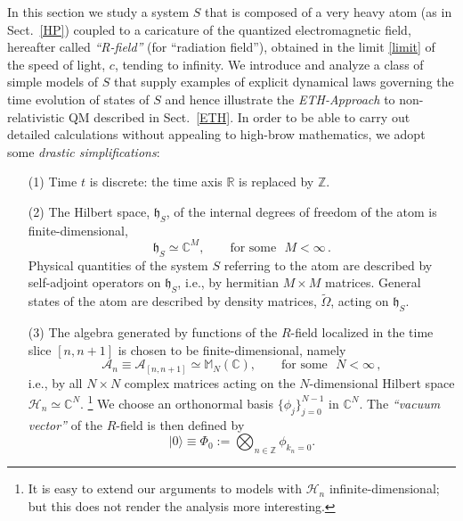 \documentclass[12pt]{article}
\begin{document}
In this section we study a system $S$ that is composed of a very heavy atom (as in Sect.~\ref{HP}) coupled to a
caricature of the quantized electromagnetic field, hereafter called \textit{``R-field''} (for ``radiation field''), obtained
in the limit \eqref{limit} of the speed of light, $c$, tending to infinity. We introduce and analyze a class of simple
models of $S$ that supply examples of explicit dynamical laws governing the time evolution of states of $S$ and
hence illustrate the \textit{\textit{ETH}-Approach} to non-relativistic QM described in Sect.~\ref{ETH}. In order to be able
to carry out detailed calculations without appealing to high-brow mathematics, we adopt some \textit{drastic simplifications}:
\begin{enumerate}
\item[(1)]{Time $t$ is discrete: the time axis $\mathbb{R}$ is replaced by $\mathbb{Z}$.}
\item[(2)]{ The Hilbert space, $\mathfrak{h}_S$, of the internal degrees of freedom of the atom is finite-dimensional,
\begin{equation}\label{atom}
\mathfrak{h}_S \simeq \mathbb{C}^{M}, \qquad \text{for some }\,\, M<\infty\,.
\end{equation}
Physical quantities of the system $S$ referring to the atom are described by self-adjoint operators on $\mathfrak{h}_S$,
i.e., by hermitian $M\times M$ matrices. General states of the atom are described by density matrices, $\widetilde{\Omega}$,
acting on $\mathfrak{h}_S$.}
\item[(3)]{The algebra generated by functions of the $R$-field localized in the time slice $[n,n+1]$ is chosen to be finite-dimensional, namely
\begin{equation}\label{algebra at fixed time}
\mathcal{A}_{n}\equiv \mathcal{A}_{[n,n+1]} \simeq \mathbb{M}_{N}(\mathbb{C}), \qquad \text{for some  }\,\, N<\infty\,,
\end{equation}
i.e., by all $N\times N$ complex matrices acting on the $N$-dimensional Hilbert space \mbox{$\mathcal{H}_n \simeq
\mathbb{C}^{N}$.} \footnote{It is easy to extend our arguments to models with $\mathcal{H}_n$
infinite-dimensional; but this does not render the analysis more interesting.} We choose an orthonormal basis
$\big\{\phi_j\big\}_{j=0}^{N-1}$ in $\mathbb{C}^{N}$. The \textit{``vacuum vector''} of the $R$-field is then defined by
\begin{equation}\label{vacuum}
\vert 0 \rangle \equiv \Phi_{{0}}:= \bigotimes_{n\in \mathbb{Z}} \phi_{k_n =0}.
\end{equation}
}
\end{enumerate}
\end{document}

